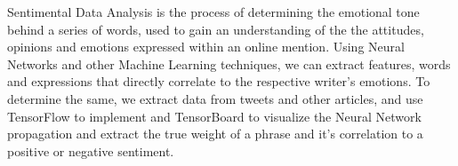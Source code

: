 Sentimental Data Analysis is the process of determining the emotional tone behind a series of words, used to gain an understanding of the the attitudes, opinions and emotions expressed within an online mention. Using Neural Networks and other Machine Learning techniques, we can extract features, words and expressions that directly correlate to the respective writer's emotions. 
To determine the same, we extract data from tweets and other articles, and use TensorFlow to implement and TensorBoard to visualize the Neural Network propagation and extract the true weight of a phrase and it's correlation to a positive or negative sentiment.